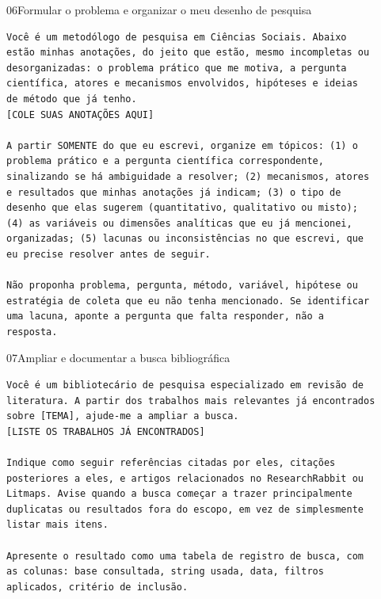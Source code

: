 \documentclass[11pt,a4paper]{article}
\begin{document}
\begin{modelo}{06}{Formular o problema e organizar o meu desenho de pesquisa}
\begin{lstlisting}
Você é um metodólogo de pesquisa em Ciências Sociais. Abaixo
estão minhas anotações, do jeito que estão, mesmo incompletas ou
desorganizadas: o problema prático que me motiva, a pergunta
científica, atores e mecanismos envolvidos, hipóteses e ideias
de método que já tenho.
[COLE SUAS ANOTAÇÕES AQUI]

A partir SOMENTE do que eu escrevi, organize em tópicos: (1) o
problema prático e a pergunta científica correspondente,
sinalizando se há ambiguidade a resolver; (2) mecanismos, atores
e resultados que minhas anotações já indicam; (3) o tipo de
desenho que elas sugerem (quantitativo, qualitativo ou misto);
(4) as variáveis ou dimensões analíticas que eu já mencionei,
organizadas; (5) lacunas ou inconsistências no que escrevi, que
eu precise resolver antes de seguir.

Não proponha problema, pergunta, método, variável, hipótese ou
estratégia de coleta que eu não tenha mencionado. Se identificar
uma lacuna, aponte a pergunta que falta responder, não a
resposta.
\end{lstlisting}
\end{modelo}

\begin{modelo}{07}{Ampliar e documentar a busca bibliográfica}
\begin{lstlisting}
Você é um bibliotecário de pesquisa especializado em revisão de
literatura. A partir dos trabalhos mais relevantes já encontrados
sobre [TEMA], ajude-me a ampliar a busca.
[LISTE OS TRABALHOS JÁ ENCONTRADOS]

Indique como seguir referências citadas por eles, citações
posteriores a eles, e artigos relacionados no ResearchRabbit ou
Litmaps. Avise quando a busca começar a trazer principalmente
duplicatas ou resultados fora do escopo, em vez de simplesmente
listar mais itens.

Apresente o resultado como uma tabela de registro de busca, com
as colunas: base consultada, string usada, data, filtros
aplicados, critério de inclusão.
\end{lstlisting}
\end{modelo}
\end{document}
